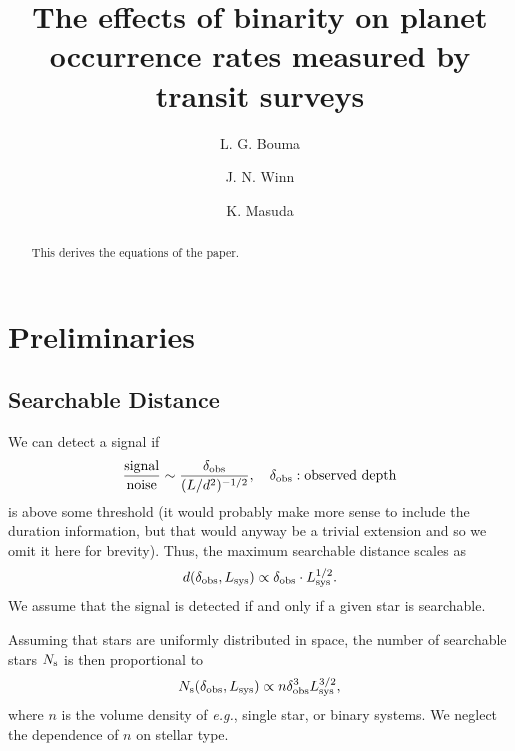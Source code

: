 \documentclass[12pt,modern]{aastex61}
\begin{document}
    
\title{ The effects of binarity on planet occurrence rates measured by transit 
surveys}
%
%
\author{L. G. Bouma}
\author{J. N. Winn}
\author{K. Masuda}
%
%
\begin{abstract}
%
This derives the equations of the paper.

%
\end{abstract}
%
%
%

\newcommand{\pt}{\theta}
\newcommand{\pa}{\theta_{\rm a}}
\newcommand{\pn}{\theta_0}

\newcommand{\pp}{\mathcal{P}}
\newcommand{\ps}{\mathcal{S}}
\renewcommand{\a}{_{\rm a}}
\newcommand{\s}{_{\rm s}}

\section{Preliminaries}

\subsection{Searchable Distance}

We can detect a signal if 
\begin{equation}
	{\text{signal}\over\text{noise}}\sim
    {\delta_{\rm obs}\over(L/d^2)^{-1/2}},
	\quad \delta_{\rm obs}:\text{observed depth}
\end{equation}
is above some threshold (it would probably make more sense to include the 
duration information, but that would anyway be a trivial extension and so we 
omit it here for brevity). Thus, the maximum searchable distance scales as
\begin{equation}
	d(\delta_{\rm obs}, L_{\rm sys}) \propto \delta_{\rm obs} \cdot L_{\rm 
	sys}^{1/2}.
\end{equation}
We assume that the signal is detected if and only if a given star is searchable. 

Assuming that stars are uniformly distributed in space, the number of 
searchable stars $N\s$ is then proportional to
\begin{equation}
	N\s(\delta_{\rm obs}, L_{\rm sys}) \propto n \delta_{\rm obs}^3 L_{\rm 
	sys}^{3/2},
\end{equation}
where $n$ is the volume density of {\it e.g.}, single star, or binary systems.
We neglect the dependence of $n$ on stellar type.
\end{document}
